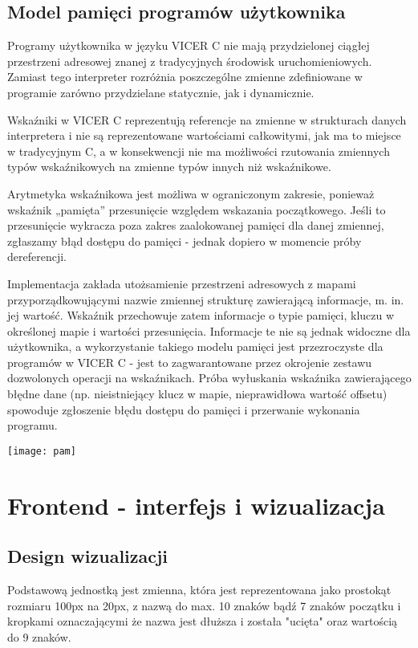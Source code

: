 \documentclass[a4paper,twoside,openright,11pt]{report}
\begin{document}
  \section {Model pamięci programów użytkownika}
  \par Programy użytkownika w języku VICER C nie mają przydzielonej ciągłej przestrzeni adresowej znanej z tradycyjnych środowisk uruchomieniowych. Zamiast tego interpreter rozróżnia poszczególne zmienne zdefiniowane w programie zarówno przydzielane statycznie, jak i dynamicznie. 
  \par Wskaźniki w VICER C reprezentują referencje na zmienne w strukturach danych interpretera i nie są reprezentowane wartościami całkowitymi, jak ma to miejsce w tradycyjnym C, a w konsekwencji nie ma możliwości rzutowania zmiennych typów wskaźnikowych na zmienne typów innych niż wskaźnikowe. 
  \par Arytmetyka wskaźnikowa jest możliwa w ograniczonym zakresie, ponieważ wskaźnik „pamięta” przesunięcie względem wskazania początkowego. Jeśli to przesunięcie wykracza poza zakres zaalokowanej pamięci dla danej zmiennej, zgłaszamy błąd dostępu do pamięci - jednak dopiero w momencie próby dereferencji. 
  \par Implementacja zakłada utożsamienie przestrzeni adresowych z mapami przyporządkowującymi nazwie zmiennej strukturę zawierającą informacje, m. in. jej wartość. Wskaźnik przechowuje zatem informacje o typie pamięci, kluczu w określonej mapie i wartości przesunięcia. Informacje te nie są jednak widoczne dla użytkownika, a wykorzystanie takiego modelu pamięci jest przezroczyste dla programów w VICER C - jest to zagwarantowane przez okrojenie zestawu dozwolonych operacji na wskaźnikach. Próba wyłuskania wskaźnika zawierającego błędne dane (np. nieistniejący klucz w mapie, nieprawidłowa wartość offsetu) spowoduje zgłoszenie błędu dostępu do pamięci i przerwanie wykonania programu.

\begin{center}
  \texttt{[image: pam]}
\end{center}

  \chapter{Frontend - interfejs i wizualizacja}
  
  \section {Design wizualizacji}
\par Podstawową jednostką jest zmienna, która jest reprezentowana jako prostokąt rozmiaru 100px na 20px, z nazwą do max. 10 znaków bądź 7 znaków początku i kropkami oznaczającymi że nazwa jest dłuższa i została "ucięta" oraz wartością do 9 znaków. 
\end{document}
